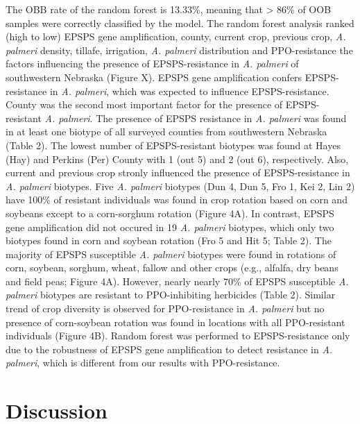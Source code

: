 \documentclass[10pt,letterpaper]{article}
\begin{document}
The OBB rate of the random forest is 13.33\%, meaning that
\textgreater{} 86\% of OOB samples were correctly classified by the
model. The random forest analysis ranked (high to low) EPSPS gene
amplification, county, current crop, previous crop, \emph{A. palmeri}
density, tillafe, irrigation, \emph{A. palmeri} distribution and
PPO-resistance the factors influencing the presence of EPSPS-resistance
in \emph{A. palmeri} of southwestern Nebraska (Figure X). EPSPS gene
amplification confers EPSPS-resistance in \emph{A. palmeri}, which was
expected to influence EPSPS-resistance. County was the second most
important factor for the presence of EPSPS-resistant \emph{A. palmeri}.
The presence of EPSPS resistance in \emph{A. palmeri} was found in at
least one biotype of all surveyed counties from southwestern Nebraska
(Table 2). The lowest number of EPSPS-resistant biotypes was found at
Hayes (Hay) and Perkins (Per) County with 1 (out 5) and 2 (out 6),
respectively. Also, current and previous crop stronly influenced the
presence of EPSPS-resistance in \emph{A. palmeri} biotypes. Five
\emph{A. palmeri} biotypes (Dun 4, Dun 5, Fro 1, Kei 2, Lin 2) have
100\% of resistant individuals was found in crop rotation based on corn
and soybeans except to a corn-sorghum rotation (Figure 4A). In contrast,
EPSPS gene amplification did not occured in 19 \emph{A. palmeri}
biotypes, which only two biotypes found in corn and soybean rotation
(Fro 5 and Hit 5; Table 2). The majority of EPSPS susceptible \emph{A.
palmeri} biotypes were found in rotations of corn, soybean, sorghum,
wheat, fallow and other crops (e.g., alfalfa, dry beans and field peas;
Figure 4A). However, nearly nearly 70\% of EPSPS susceptible \emph{A.
palmeri} biotypes are resistant to PPO-inhibiting herbicides (Table 2).
Similar trend of crop diversity is observed for PPO-resistance in
\emph{A. palmeri} but no presence of corn-soybean rotation was found in
locations with all PPO-resistant individuals (Figure 4B). Random forest
was performed to EPSPS-resistance only due to the robustness of EPSPS
gene amplification to detect resistance in \emph{A. palmeri}, which is
different from our results with PPO-resistance.

\hypertarget{discussion}{%
\section{Discussion}\label{discussion}}
\end{document}
